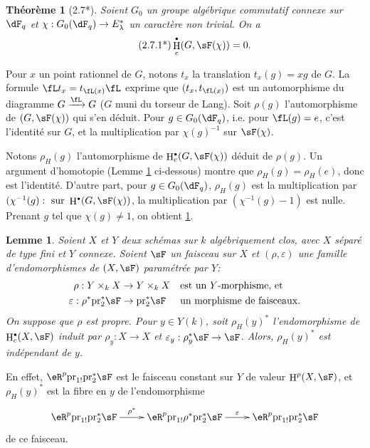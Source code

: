 \documentclass[oneside]{book}
\DeclareMathOperator{\h}{H}
\newcommand{\pr}{\mathrm{pr}} %
\theoremstyle{sga-source}
\theoremstyle{sga-source-dash}
\theoremstyle{sga-source-dotdash}
\theoremstyle{sga-source-number-note-dash}
\theoremstyle{sga-source-note-number-dotdash}
\theoremstyle{sga-source-example-dotdash}
\theoremstyle{sga-source-inline-number}
\theoremstyle{sga-source-bare-number}
\theoremstyle{sga-source}
\newtheorem{lemma_}[subsection]{Lemme}
\newtheorem*{theorem*}{Théorème}
\let\oldbullet\bullet
\renewcommand{\bullet}{\textnormal{\tiny$\oldbullet$}}
\newcommand{\PrintPage}[1]{}\newcommand{\MathPage}[1]{}\newcommand{\PrintCite}[2]{#1}\newcommand{\var}[3]{#1}
\begin{document}
\begin{theorem*}[2.7*]\label{VI:2-7*}
Soient $G_0$ un groupe algébrique commutatif connexe sur $\dF_q$ et 
$\chi:G_0(\dF_q) \to E_\lambda^\ast$ un caractère non trivial. On a 
\begin{align*}\tag{2.7.1*}\label{VI:eq:2-7-1*}
  \h_c^\bullet(G,\sF(\chi)) = 0 \text{.}
\end{align*}
\end{theorem*}

Pour $x$ un point rationnel de $G$, notons $t_x$ la translation $t_x(g) = x g$ 
de $G$. La formule $\fL t_x = t_{\fL(x)} \fL$ exprime que $(t_x,t_{\fL(x)})$ 
est un automorphisme du diagramme $G\xrightarrow\fL G$ ($G$ muni du torseur de 
Lang). Soit $\rho(g)$ l'automorphisme de $(G,\sF(\chi))$ qui s'en déduit. 
Pour $g\in G_0(\dF_q)$, i.e. pour $\fL(g) = e$, c'est l'identité sur $G$, et 
la multiplication par $\chi(g)^{-1}$ sur $\sF(\chi)$. 

Notons $\rho_H(g)$ l'automorphisme de $\h_c^\bullet(G,\sF(\chi))$ déduit de 
$\rho(g)$. Un argument d'homotopie (Lemme \ref{VI:2-8} ci-dessous) montre que 
$\rho_H(g) = \rho_H(e)$, donc est l'identité. D'autre part, pour 
$g\in G_0(\dF_q)$, $\rho_H(g)$ est la multiplication par 
$\var{(\chi^{-1}(g)}{\chi^{-1}(g)}{S45-SOL-0748}:\text{ sur }\var{\h^\bullet(G,\sF(\chi))}{\h_c^\bullet(G,\sF(\chi))}{S45-SOL-0749}$, la multiplication par 
$(\chi^{-1}(g)-1)$ est nulle. Prenant $g$ tel que $\chi(g)\ne 1$, on obtient 
\ref{VI:2-7*}. 





\begin{lemma_}\label{VI:2-8}
Soient $X$ et $Y$ deux schémas sur $k$ algébriquement clos, avec $X$ 
séparé de type fini et $Y$ connexe. Soient $\sF$ un faisceau sur $X$ et 
$(\rho,\varepsilon)$ une famille d'endomorphismes de $(X,\sF)$ paramétrée 
par $Y$: 
\begin{align*} 
  \rho:Y\times_k X &\to Y\times_k X && \text{est un $Y$-morphisme, et} \\
  \varepsilon:\rho^\ast \pr_2^\ast \sF &\to \pr_2^\ast\sF && \text{un morphisme de faisceaux.} 
\end{align*}
On suppose que $\rho$ est propre. Pour $y\in Y(k)$, soit $\rho_H(y)^\ast$ 
l'endomorphisme de $\h_c^\bullet(X,\sF)$ induit par $\rho_y:X\to X$ et 
$\varepsilon_y:\rho_y^\ast\sF\to \sF$. Alors, $\rho_H(y)^\ast$ est 
indépendant de $y$. 
\end{lemma_}

En effet, $\eR^p \pr_{1!} \pr_2^\ast\sF$ est le 
faisceau constant sur $Y$ de valeur \PrintPage{188}
$\var{\h^p(X,\sF)}{\h_c^p(X,\sF)}{S45-SOL-0750}$, et $\rho_H(y)^\ast$ est la 
fibre en $y$ de l'endomorphisme 
\[\xymatrix{
  \eR^p \pr_{1!} \pr_2^\ast \sF \ar[r]^-{\rho^\ast} 
    & \eR^p \pr_{1!} \rho^\ast \pr_2^\ast \sF \ar[r]^-\varepsilon 
    & \eR^p \pr_{1!} \pr_2^\ast \sF 
}\]
de ce faisceau. 
\end{document}
